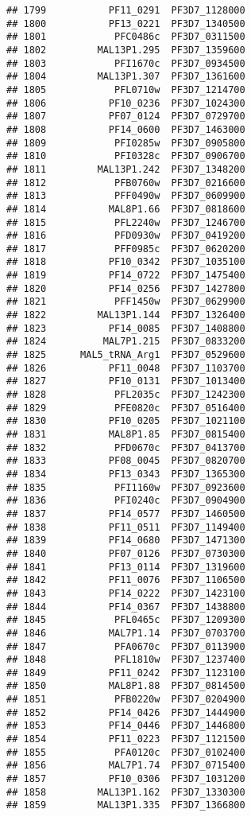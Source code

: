 \documentclass[12pt, a4paper]{article}\usepackage[]{graphicx}\usepackage[]{color}
\makeatletter
\newenvironment{kframe}{%
 \def\at@end@of@kframe{}%
 \ifinner\ifhmode%
  \def\at@end@of@kframe{\end{minipage}}%
  \begin{minipage}{\columnwidth}%
 \fi\fi%
 \def\FrameCommand##1{\hskip\@totalleftmargin \hskip-\fboxsep
 \colorbox{shadecolor}{##1}\hskip-\fboxsep
     \hskip-\linewidth \hskip-\@totalleftmargin \hskip\columnwidth}%
 \MakeFramed {\advance\hsize-\width
   \@totalleftmargin\z@ \linewidth\hsize
   \@setminipage}}%
 {\par\unskip\endMakeFramed%
 \at@end@of@kframe}
\newenvironment{knitrout}{}{} %
\makeatother
\begin{document}
\begin{knitrout}
\begin{kframe}
\begin{verbatim}
## 1799           PF11_0291  PF3D7_1128000
## 1800           PF13_0221  PF3D7_1340500
## 1801            PFC0486c  PF3D7_0311500
## 1802         MAL13P1.295  PF3D7_1359600
## 1803            PFI1670c  PF3D7_0934500
## 1804         MAL13P1.307  PF3D7_1361600
## 1805            PFL0710w  PF3D7_1214700
## 1806           PF10_0236  PF3D7_1024300
## 1807           PF07_0124  PF3D7_0729700
## 1808           PF14_0600  PF3D7_1463000
## 1809            PFI0285w  PF3D7_0905800
## 1810            PFI0328c  PF3D7_0906700
## 1811         MAL13P1.242  PF3D7_1348200
## 1812            PFB0760w  PF3D7_0216600
## 1813            PFF0490w  PF3D7_0609900
## 1814           MAL8P1.66  PF3D7_0818600
## 1815            PFL2240w  PF3D7_1246700
## 1816            PFD0930w  PF3D7_0419200
## 1817            PFF0985c  PF3D7_0620200
## 1818           PF10_0342  PF3D7_1035100
## 1819           PF14_0722  PF3D7_1475400
## 1820           PF14_0256  PF3D7_1427800
## 1821            PFF1450w  PF3D7_0629900
## 1822         MAL13P1.144  PF3D7_1326400
## 1823           PF14_0085  PF3D7_1408800
## 1824          MAL7P1.215  PF3D7_0833200
## 1825      MAL5_tRNA_Arg1  PF3D7_0529600
## 1826           PF11_0048  PF3D7_1103700
## 1827           PF10_0131  PF3D7_1013400
## 1828            PFL2035c  PF3D7_1242300
## 1829            PFE0820c  PF3D7_0516400
## 1830           PF10_0205  PF3D7_1021100
## 1831           MAL8P1.85  PF3D7_0815400
## 1832            PFD0670c  PF3D7_0413700
## 1833           PF08_0045  PF3D7_0820700
## 1834           PF13_0343  PF3D7_1365300
## 1835            PFI1160w  PF3D7_0923600
## 1836            PFI0240c  PF3D7_0904900
## 1837           PF14_0577  PF3D7_1460500
## 1838           PF11_0511  PF3D7_1149400
## 1839           PF14_0680  PF3D7_1471300
## 1840           PF07_0126  PF3D7_0730300
## 1841           PF13_0114  PF3D7_1319600
## 1842           PF11_0076  PF3D7_1106500
## 1843           PF14_0222  PF3D7_1423100
## 1844           PF14_0367  PF3D7_1438800
## 1845            PFL0465c  PF3D7_1209300
## 1846           MAL7P1.14  PF3D7_0703700
## 1847            PFA0670c  PF3D7_0113900
## 1848            PFL1810w  PF3D7_1237400
## 1849           PF11_0242  PF3D7_1123100
## 1850           MAL8P1.88  PF3D7_0814500
## 1851            PFB0220w  PF3D7_0204900
## 1852           PF14_0426  PF3D7_1444900
## 1853           PF14_0446  PF3D7_1446800
## 1854           PF11_0223  PF3D7_1121500
## 1855            PFA0120c  PF3D7_0102400
## 1856           MAL7P1.74  PF3D7_0715400
## 1857           PF10_0306  PF3D7_1031200
## 1858         MAL13P1.162  PF3D7_1330300
## 1859         MAL13P1.335  PF3D7_1366800

\end{verbatim}
\end{kframe}
\end{knitrout}
\end{document}
